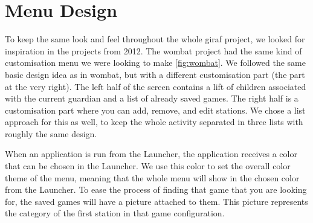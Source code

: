 \section{Menu Design}
\label{designmenu}
To keep the same look and feel throughout the whole \ac{giraf} project, we looked for inspiration in the projects from 2012. The \ac{wombat} project had the same kind of customisation menu we were looking to make \autoref{fig:wombat}. We followed the same basic design idea as in \ac{wombat}, but with a different customisation part (the part at the very right). The left half of the screen contains a lift of children associated with the current guardian and a list of already saved games. The right half is a customisation part where you can add, remove, and edit stations. We chose a list approach for this as well, to keep the whole activity separated in three lists with roughly the same design.

When an application is run from the Launcher, the application receives a color that can be chosen in the Launcher. We use this color to set the overall color theme of the menu, meaning that the whole menu will show in the chosen color from the Launcher.
To ease the process of finding that game that you are looking for, the saved games will have a picture attached to them. This picture represents the category of the first station in that game configuration.


